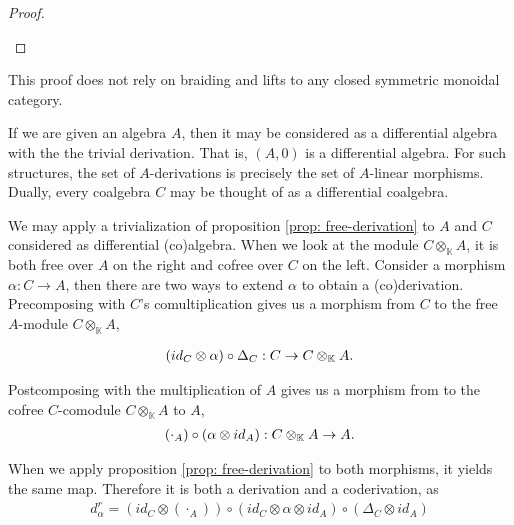\documentclass[../thesis.tex]{subfiles}
\begin{document}
\begin{proof}
\begin{center}
                \end{center}
            \end{proof}

            This proof does not rely on braiding and lifts to any closed symmetric monoidal category.

            If we are given an algebra $A$, then it may be considered as a differential algebra with the the trivial derivation. That is, $(A, 0)$ is a differential algebra. For such structures, the set of $A$-derivations is precisely the set of $A$-linear morphisms. Dually, every coalgebra $C$ may be thought of as a differential coalgebra. 
            
            We may apply a trivialization of proposition \ref{prop: free-derivation} to $A$ and $C$ considered as differential (co)algebra. When we look at the module $C\otimes_\mathbb{K}A$, it is both free over $A$ on the right and cofree over $C$ on the left. Consider a morphism $\alpha : C \rightarrow A$, then there are two ways to extend $\alpha$ to obtain a (co)derivation. Precomposing with $C$'s comultiplication gives us a morphism from $C$ to the free $A$-module $C\otimes_\mathbb{K} A$,

            \begin{align*}
                (id_C\otimes \alpha) \circ \Delta_C : C \rightarrow C \otimes_\mathbb{K} A\tt{.}
            \end{align*}

            Postcomposing with the multiplication of $A$ gives us a morphism from to the cofree $C$-comodule $C\otimes_\mathbb{K}A$ to $A$,
            \begin{align*}
                (\cdot_A) \circ (\alpha\otimes id_A) : C \otimes_\mathbb{K} A \rightarrow A\tt{.}
            \end{align*}

            When we apply proposition \ref{prop: free-derivation} to both morphisms, it yields the same map. Therefore it is both a derivation and a coderivation, as
            \begin{align*}
                d_\alpha^r = (id_C\otimes (\cdot_A)) \circ (id_C \otimes \alpha \otimes id_A) \circ (\Delta_C\otimes id_A)
            \end{align*}
\end{document}
